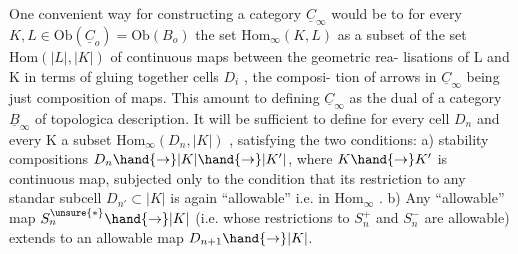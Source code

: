 

 One convenient way for constructing  a category $\underline{C}_\infty$ would be to 
for every $K,L \in \mathrm{Ob}(\underline{C}_o) = \mathrm{Ob}(B_o)$ the set $\mathrm{Hom}_\infty(K,L)$ as a subset of
the set $\mathrm{Hom}(|L|,|K|)$ of continuous maps  between the geometric rea-%
lisations of L and K in terms of gluing together cells $D_i$ , the composi-%
tion of arrows in $\underline{C}_\infty$ being just composition of maps. This amount to
defining $\underline{C}_\infty$ as  the dual of a category $\underline{B}_\infty$ of topologica
description. It will be sufficient to define for every cell $D_n$ and
every K a subset $\mathrm{Hom}_\infty(D_n,|K|)$ , satisfying the two conditions:
a) stability  compositions $D_n \hand{\to} |K| \hand{\to} |K'|$, where $K \hand{\to} K'$
is  continuous map,  subjected only to the condition that its restriction
to any standar subcell $D_{n'} \subset |K|$ is again ``allowable'' i.e. in $\mathrm{Hom}_\infty$ .
b) Any ``allowable'' map $S_n^{\unsure{*}} \hand{\to} |K|$ (i.e. whose restrictions to $S_n^+$ and
$S_n^-$ are allowable) extends to an allowable map $D_{n+1} \hand{\to} |K|$.

